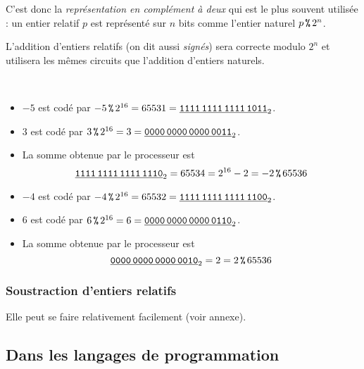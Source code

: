 C'est donc la \emph{représentation en complément à deux} qui est le plus souvent utilisée : un entier relatif $p$ est représenté sur $n$ bits comme l'entier naturel $p\operatorname{\texttt{\%}} 2^n$. 

\begin{rem}
  L'addition d'entiers relatifs (on dit aussi \emph{signés}) sera correcte modulo $2^{n}$ et utilisera les mêmes circuits que l'addition d'entiers naturels.
\end{rem}
\begin{exemple} ~\\
\begin{itemize}
\item[\textbullet] $-5$ est codé par $-5 \operatorname{\texttt{\%}} 2^{16} = 65531 =
  \underline{\text{\texttt{1111\,1111\,1111\,1011}}}_{2}$.
\item[\textbullet] $3$ est codé par $3 \operatorname{\texttt{\%}} 2^{16} = 3 =
  \underline{\text{\texttt{0000\,0000\,0000\,0011}}}_{2}$.
\item[\textbullet] La somme obtenue par le processeur est
  \begin{equation*}
    \underline{\text{\texttt{1111\,1111\,1111\,1110}}}_{2} = 65534 = 2^{16}-2 = -2 \operatorname{\texttt{\%}} 65536
  \end{equation*}
\end{itemize}

\begin{itemize}
\item[\textbullet] $-4$ est codé par $-4 \operatorname{\texttt{\%}} 2^{16} = 65532 =
  \underline{\text{\texttt{1111\,1111\,1111\,1100}}}_{2}$.
\item[\textbullet] $6$ est codé par $6 \operatorname{\texttt{\%}} 2^{16} = 6 =
  \underline{\text{\texttt{0000\,0000\,0000\,0110}}}_{2}$.
\item[\textbullet] La somme obtenue par le processeur est
  \begin{equation*}
   \underline{\text{\texttt{0000\,0000\,0000\,0010}}}_{2} = 2 = 2 \operatorname{\texttt{\%}} 65536
  \end{equation*}
\end{itemize}
\end{exemple}

\subsubsection{Soustraction d'entiers relatifs}

Elle peut se faire relativement facilement (voir annexe).



\subsection{Dans les langages de programmation}

